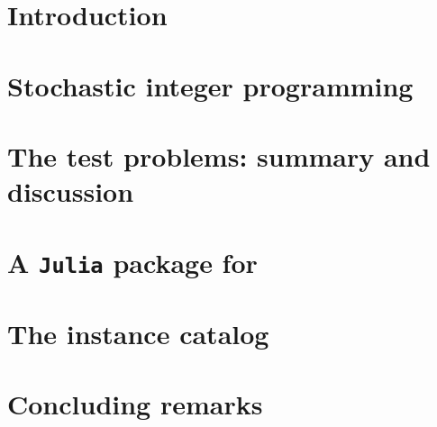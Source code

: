 \date{Received: date / Accepted: date}

\maketitle


\pagebreak



\section{Introduction}\label{sec:intro}


\section{Stochastic integer programming}\label{sec:sip}

 
\section{The test problems: summary and discussion}\label{sec:summary}


\section{A \texttt{Julia} package for \siplibtwo} \label{sec:siplibjl}


\section{The instance catalog}\label{sec:instance_catalog}


\section{Concluding remarks}\label{sec:conclusion}



\appendix
\pagebreak

